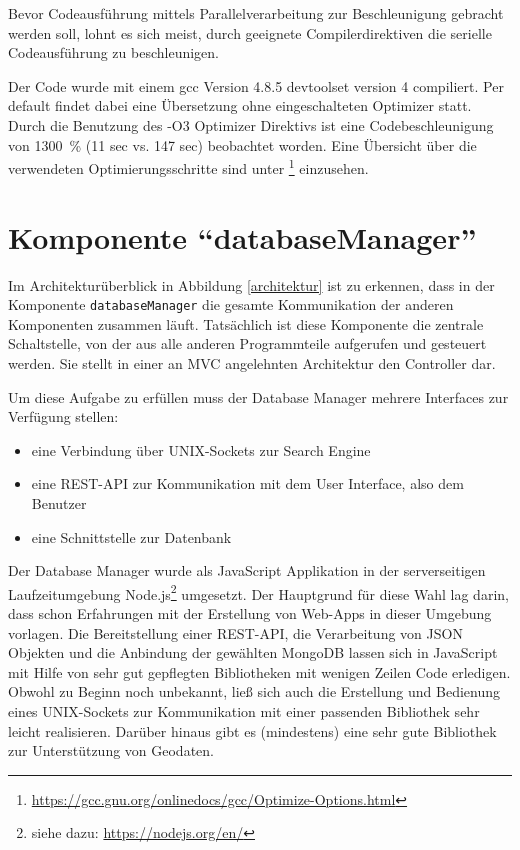 \documentclass[10pt,a4paper]{report}
\begin{document}
Bevor Codeausführung mittels Parallelverarbeitung zur Beschleunigung gebracht werden soll, lohnt es sich meist, durch geeignete Compilerdirektiven die serielle Codeausführung zu beschleunigen.

Der Code wurde mit einem gcc Version 4.8.5 devtoolset version 4 compiliert. Per default findet dabei eine Übersetzung ohne eingeschalteten Optimizer statt. 
Durch die Benutzung des -O3 Optimizer Direktivs ist eine Codebeschleunigung von 1300~\% (11 sec vs. 147 sec) beobachtet worden. 
Eine Übersicht über die verwendeten Optimierungsschritte sind unter \footnote{\url{https://gcc.gnu.org/onlinedocs/gcc/Optimize-Options.html}} einzusehen.

\chapter{Komponente "`databaseManager"'}

Im Architekturüberblick in Abbildung \ref{architektur} ist zu erkennen, dass in der Komponente \texttt{databaseManager} die gesamte Kommunikation der anderen Komponenten zusammen läuft. Tatsächlich ist diese Komponente die zentrale Schaltstelle, von der aus alle anderen Programmteile aufgerufen und gesteuert werden. Sie stellt in einer an MVC angelehnten Architektur den Controller dar.

Um diese Aufgabe zu erfüllen muss der Database Manager mehrere Interfaces zur Verfügung stellen:
\begin{itemize}
	\item eine Verbindung über UNIX-Sockets zur Search Engine
	\item eine REST-API zur Kommunikation mit dem User Interface, also dem Benutzer
	\item eine Schnittstelle zur Datenbank
\end{itemize}

Der Database Manager wurde als JavaScript Applikation in der serverseitigen Laufzeitumgebung Node.js\footnote{siehe dazu: \href{https://nodejs.org/en/}{https://nodejs.org/en/}} umgesetzt. Der Hauptgrund für diese Wahl lag darin, dass schon Erfahrungen mit der Erstellung von Web-Apps in dieser Umgebung vorlagen. Die Bereitstellung einer REST-API, die Verarbeitung von JSON Objekten und die Anbindung der gewählten MongoDB lassen sich in JavaScript mit Hilfe von sehr gut gepflegten Bibliotheken mit wenigen Zeilen Code erledigen. Obwohl zu Beginn noch unbekannt, ließ sich auch die Erstellung und Bedienung eines UNIX-Sockets zur Kommunikation mit einer passenden Bibliothek sehr leicht realisieren.
Darüber hinaus gibt es (mindestens) eine sehr gute Bibliothek zur Unterstützung von Geodaten. 
\end{document}
